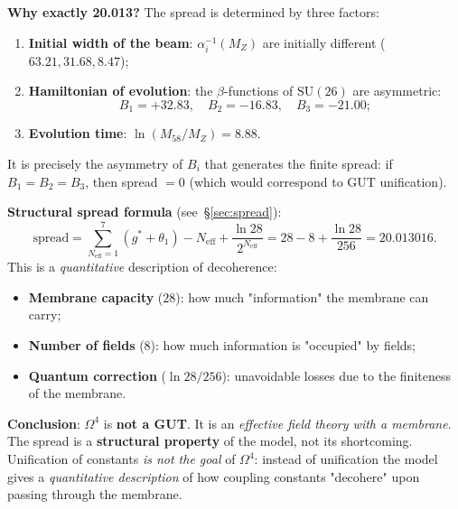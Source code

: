 \documentclass[11pt,a4paper]{article}
\newcommand{\SU}{\ensuremath{\mathrm{SU}}}
\newcommand{\Om}{\ensuremath{\Omega^4}}
\theoremstyle{definition}
\begin{document}
\medskip\noindent
\textbf{Why exactly 20.013?}
The spread is determined by three factors:
\begin{enumerate}
    \item \textbf{Initial width of the beam}:
          $\alpha_i^{-1}(M_Z)$ are initially different
          ($63.21, 31.68, 8.47$);
    \item \textbf{Hamiltonian of evolution}:
          the $\beta$-functions of $\SU(26)$ are asymmetric:
          \begin{equation}
              B_1 = +32.83, \quad
              B_2 = -16.83, \quad
              B_3 = -21.00;
          \end{equation}
    \item \textbf{Evolution time}:
          $\ln(M_{58}/M_Z) = 8.88$.
\end{enumerate}
It is precisely the asymmetry of $B_i$ that generates the finite spread:
if $B_1 = B_2 = B_3$, then spread $= 0$ (which
would correspond to GUT unification).

\medskip\noindent
\textbf{Structural spread formula} (see~\S\ref{sec:spread}):
\begin{equation}
    \boxed{
    \text{spread} = \sum_{N_{\text{eff}}=1}^{7}(g^* + \theta_1)
    - N_{\text{eff}} + \frac{\ln 28}{2^{N_{\text{eff}}}}
    = 28 - 8 + \frac{\ln 28}{256} = 20.013016.
    }
    \label{eq:spread-structural-membrane}
\end{equation}
This is a \emph{quantitative} description of decoherence:
\begin{itemize}
    \item \textbf{Membrane capacity} ($28$): how much
          "information" the membrane can carry;
    \item \textbf{Number of fields} ($8$): how much information
          is "occupied" by fields;
    \item \textbf{Quantum correction} ($\ln 28/256$):
          unavoidable losses due to the finiteness of the membrane.
\end{itemize}

\medskip\noindent
\textbf{Conclusion}: $\Om$ is \textbf{not a GUT}. It is
an \emph{effective field theory with a membrane}.
The spread is a \textbf{structural property}
of the model, not its shortcoming. Unification of constants
\emph{is not the goal} of $\Om$: instead of unification
the model gives a \emph{quantitative description} of how
coupling constants "decohere" upon passing
through the membrane.
\end{document}
